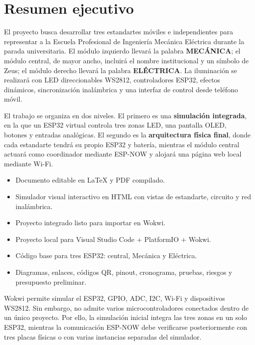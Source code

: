 \documentclass[11pt,a4paper]{article}
\begin{document}
\section{Resumen ejecutivo}
\begin{resumenbox}
El proyecto busca desarrollar tres estandartes móviles e independientes para representar a la Escuela Profesional de Ingeniería Mecánica Eléctrica durante la parada universitaria. El módulo izquierdo llevará la palabra \textbf{MECÁNICA}; el módulo central, de mayor ancho, incluirá el nombre institucional y un símbolo de Zeus; el módulo derecho llevará la palabra \textbf{ELÉCTRICA}. La iluminación se realizará con LED direccionables WS2812, controladores ESP32, efectos dinámicos, sincronización inalámbrica y una interfaz de control desde teléfono móvil.
\end{resumenbox}

El trabajo se organiza en dos niveles. El primero es una \textbf{simulación integrada}, en la que un ESP32 virtual controla tres zonas LED, una pantalla OLED, botones y entradas analógicas. El segundo es la \textbf{arquitectura física final}, donde cada estandarte tendrá su propio ESP32 y batería, mientras el módulo central actuará como coordinador mediante ESP-NOW y alojará una página web local mediante Wi-Fi.

\begin{successbox}
\begin{itemize}
  \item Documento editable en \LaTeX{} y PDF compilado.
  \item Simulador visual interactivo en HTML con vistas de estandarte, circuito y red inalámbrica.
  \item Proyecto integrado listo para importar en Wokwi.
  \item Proyecto local para Visual Studio Code + PlatformIO + Wokwi.
  \item Código base para tres ESP32: central, Mecánica y Eléctrica.
  \item Diagramas, enlaces, códigos QR, pinout, cronograma, pruebas, riesgos y presupuesto preliminar.
\end{itemize}
\end{successbox}

\begin{alertbox}
Wokwi permite simular el ESP32, GPIO, ADC, I2C, Wi-Fi y dispositivos WS2812. Sin embargo, no admite varios microcontroladores conectados dentro de un único proyecto. Por ello, la simulación inicial integra las tres zonas en un solo ESP32, mientras la comunicación ESP-NOW debe verificarse posteriormente con tres placas físicas o con varias instancias separadas del simulador. \cite{wokwi-faq,wokwi-esp32}
\end{alertbox}
\end{document}
